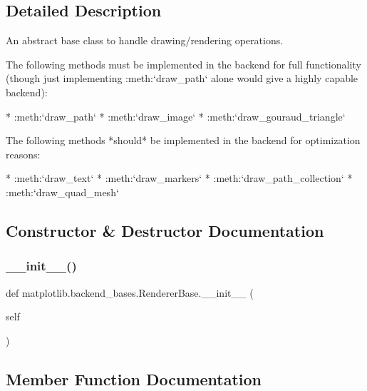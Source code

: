 \subsection{Detailed Description}
\begin{DoxyVerb}An abstract base class to handle drawing/rendering operations.

The following methods must be implemented in the backend for full
functionality (though just implementing :meth:`draw_path` alone would
give a highly capable backend):

* :meth:`draw_path`
* :meth:`draw_image`
* :meth:`draw_gouraud_triangle`

The following methods *should* be implemented in the backend for
optimization reasons:

* :meth:`draw_text`
* :meth:`draw_markers`
* :meth:`draw_path_collection`
* :meth:`draw_quad_mesh`
\end{DoxyVerb}
 

\subsection{Constructor \& Destructor Documentation}
\mbox{\label{classmatplotlib_1_1backend__bases_1_1RendererBase_ae677a0bb8f81e30459f81b5ff62fd771}} 
\subsubsection{\texorpdfstring{\+\_\+\+\_\+init\+\_\+\+\_\+()}{\_\_init\_\_()}}
{\footnotesize\ttfamily def matplotlib.\+backend\+\_\+bases.\+Renderer\+Base.\+\_\+\+\_\+init\+\_\+\+\_\+ (\begin{DoxyParamCaption}\item[{}]{self }\end{DoxyParamCaption})}



\subsection{Member Function Documentation}
\mbox{\label{classmatplotlib_1_1backend__bases_1_1RendererBase_a18b934bbefd751765565059b82a04dd6}} 
